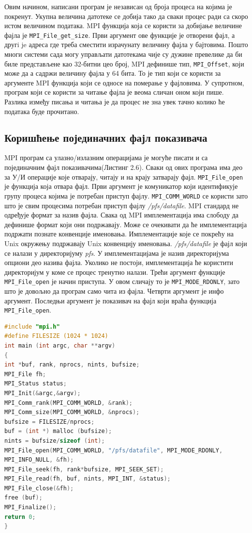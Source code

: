 Овим начином, написани програм је независан од броја процеса на којима је покренут. Укупна величина датотеке се добија тако да сваки процес ради са скоро истом величином података.
MPI функција која се користи за добијање величине фајла је  \texttt{MPI\_File\_get\_size}. Први аргумент ове функције је отворени фајл, а другi je адреса где треба сместити израчунату величину фајла у бајтовима. Пошто многи системи сада могу управљати датотекама чије су дужине превелике да би биле
представљене као 32-битни цео број, MPI дефинише тип,  \texttt{MPI\_Offset}, који може да а садржи величину фајла у 64 бита. 
То је тип који се користи 
за аргументе MPI функција који се односе на померање у фајловима. У супротном, програм који се користи за читање фајла је веома сличан оном који пише. Разлика између писања и читања је да процес не зна увек тачно колико ће података буде прочитано.

\subsection{Коришћење појединачних фајл показивача}

MPI програм са улазно/излазним операцијама је могуће писати и са појединачним фајл показивачима(Листинг 2.6). Сваки од ових програма има део за У/И операције које отварају, читају и на крају затварају фајл. \texttt{MPI\_File\_open} је функција која отвара фајл. Први аргумент је комуникатор који идентификује групу процеса којима је потребан приступ фајлу. \texttt{MPI\_COMM\_WORLD} се користи зато што је свим процесима потребан приступ фајлу \textit{/pfs/datafile}. MPI стандард не одређује формат за назив фајла. Свака од MPI имплементација има слободу да дефинише формат који они подржавају. Може се очекивати да ће имплементација подржати познате конвенције именовања. Имплементације које се покрећу на Unix окружењу подржавају Unix конвенцију именовања. \textit{/pfs/datafile} је фајл који се налази у директоријуму \textit{pfs}. У имплементацијама је назив директоријума опциони део назива фајла. Уколико не постоји, имплементација ће користити директоријум у коме се процес тренутно налази. Трећи аргумент функције \texttt{MPI\_File\_open} је начин приступа. У овом сличају то је \texttt{MPI\_MODE\_RDONLY}, зато што је довољно да програм само чита из фајла. Четврти аргумент је инфо аргумент. Последњи аргумент је показивач на фајл који враћа функција \texttt{MPI\_File\_open}.


\begin{lstlisting}[style=nonumbers,frame=single,language=C, caption= MPI програм са појединачним фајл показивачима]
#include "mpi.h"
#define FILESIZE (1024 * 1024)
int main (int argc, char **argv)
{
int *buf, rank, nprocs, nints, bufsize;
MPI_File fh;
MPI_Status status;
MPI_Init(&argc,&argv);
MPI_Comm_rank(MPI_COMM_WORLD, &rank);
MPI_Comm_size(MPI_COMM_WORLD, &nprocs);
bufsize = FILESIZE/nprocs;
buf = (int *) malloc (bufsize);
nints = bufsize/sizeof (int);
MPI_File_open(MPI_COMM_WORLD, "/pfs/datafile", MPI_MODE_RDONLY,
MPI_INFO_NULL, &fh);
MPI_File_seek(fh, rank*bufsize, MPI_SEEK_SET);
MPI_File_read(fh, buf, nints, MPI_INT, &status);
MPI_File_close(&fh);
free (buf);
MPI_Finalize();
return 0;
}
\end{lstlisting}

